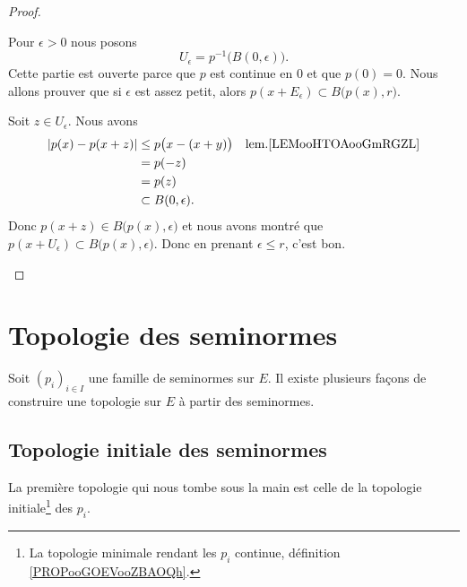 \begin{proof}
\begin{subproof}
		Pour \( \epsilon>0\) nous posons
		\begin{equation}
			U_{\epsilon}=p^{-1}\big( B(0,\epsilon) \big).
		\end{equation}
		Cette partie est ouverte parce que \( p\) est continue en \( 0\) et que \( p(0)=0\). Nous allons prouver que si \( \epsilon\) est assez petit, alors \( p(x+E_{\epsilon})\subset B\big( p(x),r \big)\).

		Soit \( z\in U_{\epsilon}\). Nous avons
		\begin{subequations}
			\begin{align}
				| p(x)-p(x+z) | & \leq p\big( x-(x+y) \big) & \text{lem.\ref{LEMooHTOAooGmRGZL}} \\
				                & =p(-z)                                                         \\
				                & =p(z)                                                          \\
				                & \subset B(0,\epsilon).
			\end{align}
		\end{subequations}
		Donc \( p(x+z)\in B\big( p(x),\epsilon \big)\) et nous avons montré que \( p(x+U_{\epsilon})\subset B\big( p(x),\epsilon \big)\). Donc en prenant \( \epsilon\leq r\), c'est bon.
	\end{subproof}
\end{proof}

\section{Topologie des seminormes}

Soit \( (p_i)_{i\in I}\) une famille de seminormes sur \( E\). Il existe plusieurs façons de construire une topologie sur \( E\) à partir des seminormes.

\subsection{Topologie initiale des seminormes}


La première topologie qui nous tombe sous la main est celle de la topologie initiale\footnote{La topologie minimale rendant les \( p_i\) continue, définition \ref{PROPooGOEVooZBAOQh}.} des \( p_i\).

